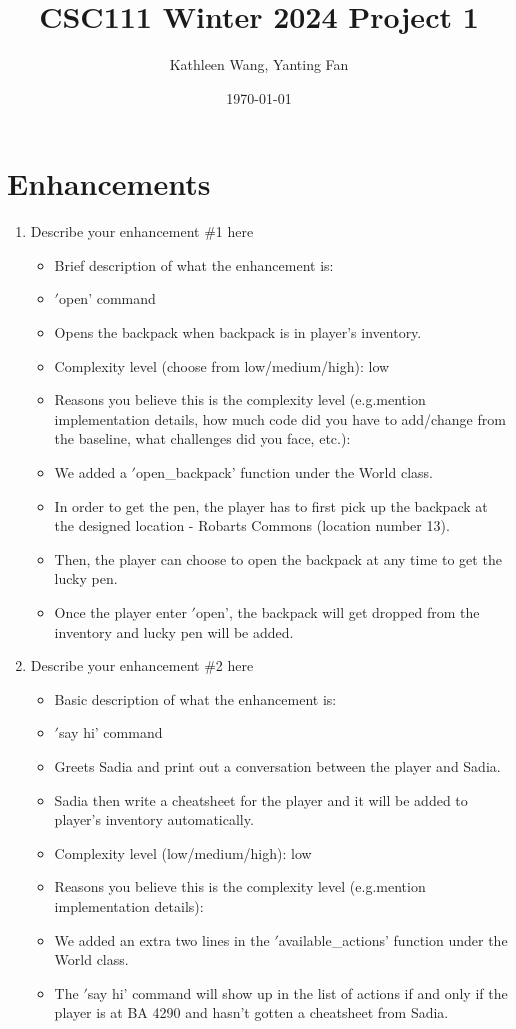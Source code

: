 \documentclass[11pt]{article}
\title{CSC111 Winter 2024 Project 1}
\author{Kathleen Wang, Yanting Fan}
\date{\today}
\begin{document}
\maketitle

\section*{Enhancements}


\begin{enumerate}

\item Describe your enhancement \#1 here
	\begin{itemize}
	\item Brief description of what the enhancement is:
        \item \('\)open' command
        \item Opens the backpack when backpack is in player's inventory.
	\item Complexity level (choose from low/medium/high): low
	\item Reasons you believe this is the complexity level (e.g.mention implementation details, how much code did you have to add/change from the baseline, what challenges did you face, etc.):
        \item We added a \('\)open\_backpack' function under the World class.
        \item In order to get the pen, the player has to first pick up the backpack at the designed location - Robarts Commons (location number 13).
        \item Then, the player can choose to open the backpack at any time to get the lucky pen.
        \item Once the player enter \('\)open', the backpack will get dropped from the inventory and lucky pen will be added.
	\end{itemize}


\item Describe your enhancement \#2 here
	\begin{itemize}
	\item Basic description of what the enhancement is:
        \item \('\)say hi' command
        \item Greets Sadia and print out a conversation between the player and Sadia.
        \item Sadia then write a cheatsheet for the player and it will be added to player's inventory automatically.
	\item Complexity level (low/medium/high): low
	\item Reasons you believe this is the complexity level (e.g.mention implementation details):
        \item We added an extra two lines in the \('\)available\_actions' function under the World class.
        \item The \('\)say hi' command will show up in the list of actions if and only if the player is at BA 4290 and hasn't gotten a cheatsheet from Sadia.
	\end{itemize}



\end{enumerate}
\end{document}
